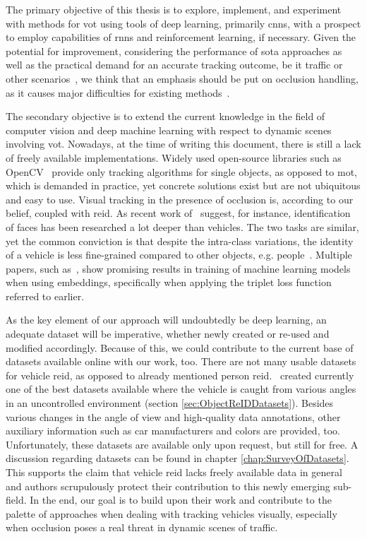The primary objective of this thesis is to explore, implement, and experiment with methods for \gls{vot} using tools of deep learning, primarily \glspl{cnn}, with a prospect to employ capabilities of \glspl{rnn} and reinforcement learning, if necessary. Given the potential for improvement, considering the performance of \gls{sota} approaches as well as the practical demand for an accurate tracking outcome, be it traffic or other scenarios~\cite{Tang2019}, we think that an emphasis should be put on occlusion handling, as it causes major difficulties for existing methods~\cite{Jiyan2007}.

The secondary objective is to extend the current knowledge in the field of computer vision and deep machine learning with respect to dynamic scenes involving \gls{vot}. Nowadays, at the time of writing this document, there is still a lack of freely available implementations. Widely used open-source libraries such as OpenCV~\cite{opencv_library} provide only tracking algorithms for single objects, as opposed to \gls{mot}, which is demanded in practice, yet concrete solutions exist but are not ubiquitous and easy to use. Visual tracking in the presence of occlusion is, according to our belief, coupled with \gls{reid}. As recent work of~\cite{Kuma2019} suggest, for instance, identification of faces has been researched a lot deeper than vehicles. The two tasks are similar, yet the common conviction is that despite the intra-class variations, the identity of a vehicle is less fine-grained compared to other objects, e.g. people~\cite{Kuma2019}. Multiple papers, such as~\cite{Schroff2015, Hermans2017}, show promising results in training of machine learning models when using embeddings, specifically when applying the triplet loss function referred to earlier.

As the key element of our approach will undoubtedly be deep learning, an adequate dataset will be imperative, whether newly created or re-used and modified accordingly. Because of this, we could contribute to the current base of datasets available online with our work, too. There are not many usable datasets for vehicle \gls{reid}, as opposed to already mentioned person \gls{reid}.~\cite{Liu2018, yan2017exploiting} created currently one of the best datasets available where the vehicle is caught from various angles in an uncontrolled environment (section \ref{sec:ObjectReIDDatasets}). Besides various changes in the angle of view and high-quality data annotations, other auxiliary information such as car manufacturers and colors are provided, too. Unfortunately, these datasets are available only upon request, but still for free. A discussion regarding datasets can be found in chapter \ref{chap:SurveyOfDatasets}. This supports the claim that vehicle \gls{reid} lacks freely available data in general and authors scrupulously protect their contribution to this newly emerging sub-field. In the end, our goal is to build upon their work and contribute to the palette of approaches when dealing with tracking vehicles visually, especially when occlusion poses a real threat in dynamic scenes of traffic.
